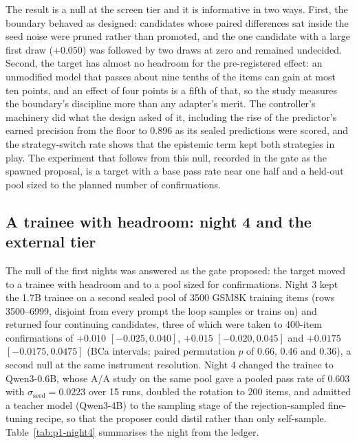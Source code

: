 The result is a null at the screen tier and it is informative in two ways. First, the boundary behaved as designed: candidates whose paired differences sat inside the seed noise were pruned rather than promoted, and the one candidate with a large first draw ($+0.050$) was followed by two draws at zero and remained undecided. Second, the target has almost no headroom for the pre-registered effect: an unmodified model that passes about nine tenths of the items can gain at most ten points, and an effect of four points is a fifth of that, so the study measures the boundary's discipline more than any adapter's merit. The controller's machinery did what the design asked of it, including the rise of the predictor's earned precision from the floor to 0.896 as its sealed predictions were scored, and the strategy-switch rate shows that the epistemic term kept both strategies in play. The experiment that follows from this null, recorded in the gate as the spawned proposal, is a target with a base pass rate near one half and a held-out pool sized to the planned number of confirmations.


\subsection{A trainee with headroom: night 4 and the external tier}
\label{sec:results-p1}

The null of the first nights was answered as the gate proposed: the target moved to a trainee with headroom and to a pool sized for confirmations. Night 3 kept the 1.7B trainee on a second sealed pool of 3500 GSM8K training items (rows 3500--6999, disjoint from every prompt the loop samples or trains on) and returned four continuing candidates, three of which were taken to 400-item confirmations of $+0.010$ $[-0.025, 0.040]$, $+0.015$ $[-0.020, 0.045]$ and $+0.0175$ $[-0.0175, 0.0475]$ (BCa intervals; paired permutation $p$ of 0.66, 0.46 and 0.36), a second null at the same instrument resolution. Night 4 changed the trainee to Qwen3-0.6B, whose A/A study on the same pool gave a pooled pass rate of 0.603 with $\sigma_{\mathrm{seed}}=0.0223$ over 15 runs, doubled the rotation to 200 items, and admitted a teacher model (Qwen3-4B) to the sampling stage of the rejection-sampled fine-tuning recipe, so that the proposer could distil rather than only self-sample. Table~\ref{tab:p1-night4} summarises the night from the ledger.

